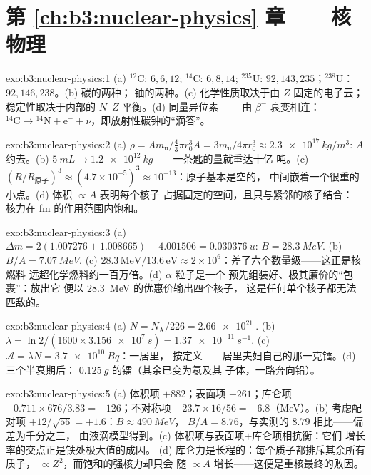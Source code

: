 \section*{第 \ref{ch:b3:nuclear-physics} 章——核物理}

\begin{solution}{exo:b3:nuclear-physics:1}
(a) $^{12}$C: $6, 6, 12$; $^{14}$C: $6, 8, 14$; $^{235}$U:
$92, 143, 235$；$^{238}$U：$92, 146, 238$。(b) 碳的两种；
铀的两种。(c) 化学性质取决于由 $Z$ 固定的电子云；
稳定性取决于内部的 $N$--$Z$ 平衡。(d) 同量异位素——
由 $\beta^-$ 衰变相连：$^{14}\text{C} \to {}^{14}\text{N}
+ \text{e}^- + \bar\nu$，即放射性碳钟的“滴答”。
\end{solution}

\begin{solution}{exo:b3:nuclear-physics:2}
(a) $\rho = Am_{\text{u}}/\tfrac43\pi r_0^3A =
3m_{\text{u}}/4\pi r_0^3 \approx \qty{2.3e17}{kg/m^3}$: $A$
约去。(b) $\qty{5}{mL} \to \qty{1.2e12}{kg}$——一茶匙的量就重达十亿
吨。(c) $(R/R_{\text{原子}})^3 \approx
(4.7\times10^{-5})^3 \approx 10^{-13}$：原子基本是空的，
中间嵌着一个很重的小点。(d) 体积 $\propto A$ 表明每个核子
占据固定的空间，且只与紧邻的核子结合：
核力在 \unit{fm} 的作用范围内饱和。
\end{solution}

\begin{solution}{exo:b3:nuclear-physics:3}
(a) $\Delta m = 2(1.007276 + 1.008665) - 4.001506 =
\qty{0.030376}{u}$: $B = \qty{28.3}{MeV}$. (b) $B/A =
\qty{7.07}{MeV}$. (c) $28.3\,\text{MeV}/13.6\,\text{eV} \approx
2\times10^6$：差了六个数量级——这正是核燃料
远超化学燃料约一百万倍。(d) $\alpha$ 粒子是一个
预先组装好、极其廉价的“包裹”：放出它
便以 \qty{28.3}{MeV} 的优惠价输出四个核子，
这是任何单个核子都无法匹敌的。
\end{solution}

\begin{solution}{exo:b3:nuclear-physics:4}
(a) $N = N_{\text{A}}/226 = \qty{2.66e21}{}$. (b) $\lambda =
\ln2/(1600\times\qty{3.156e7}{s}) = \qty{1.37e-11}{s^{-1}}$. (c)
$\mathcal A = \lambda N = \qty{3.7e10}{Bq}$：一居里，
按定义——居里夫妇自己的那一克镭。(d) 三个半衰期后：
$\qty{0.125}{g}$ 的镭（其余已变为氡及其
子体，一路奔向铅）。
\end{solution}

\begin{solution}{exo:b3:nuclear-physics:5}
(a) 体积项 $+882$；表面项 $-261$；库仑项 $-0.711\times676/3.83
= -126$；不对称项 $-23.7\times16/56 = -6.8$（\unit{MeV}）。(b)
考虑配对项 $+12/\sqrt{56} = +1.6$：$B \approx \qty{490}{MeV}$，
$B/A = 8.76$，与实测的 $8.79$ 相比——偏差为千分之三，
由液滴模型得到。(c) 体积项与表面项$+$库仑项相抗衡：它们
增长率的交点正是铁处极大值的成因。
(d) 库仑力是长程的：每个质子都排斥其余所有质子，
$\propto Z^2$，而饱和的强核力却只会
随 $\propto A$ 增长——这便是重核最终的败因。
\end{solution}

